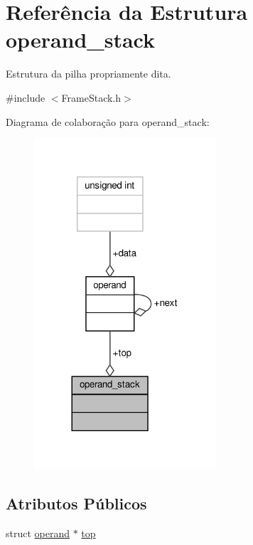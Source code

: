 \hypertarget{structoperand__stack}{}\section{Referência da Estrutura operand\+\_\+stack}
\label{structoperand__stack}


Estrutura da pilha propriamente dita.  




{\ttfamily \#include $<$Frame\+Stack.\+h$>$}



Diagrama de colaboração para operand\+\_\+stack\+:\nopagebreak
\begin{figure}[H]
\begin{center}
\leavevmode
\includegraphics[width=192pt]{structoperand__stack__coll__graph}
\end{center}
\end{figure}
\subsection*{Atributos Públicos}
\begin{DoxyCompactItemize}
\item 
struct \hyperlink{structoperand}{operand} $\ast$ \hyperlink{structoperand__stack_a39f0f405579d0f45a1d03b30b1c2731e}{top}
\end{DoxyCompactItemize}


